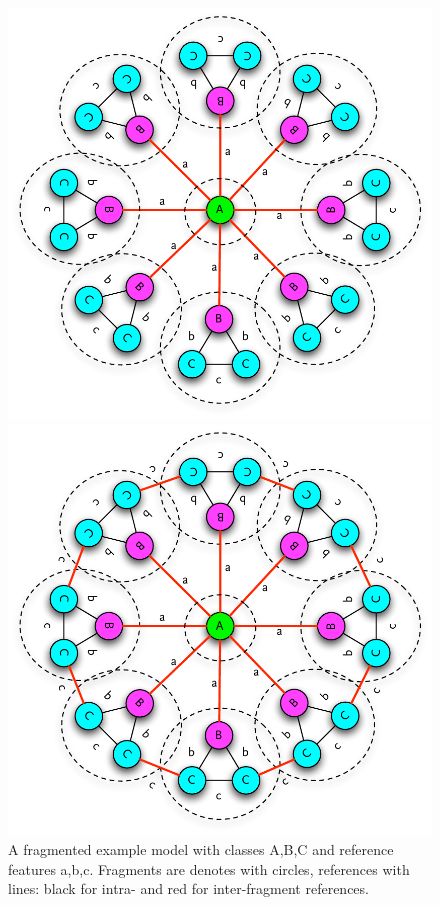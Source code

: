 \begin{figure}[ht]
\begin{minipage}[b]{0.5\linewidth}
\centering
\includegraphics[width=\linewidth]{figures/metamodel_fragmentation_patterns_tree}
\caption{A fragmented example  model with classes A,B,C and reference features a,b,c. Fragments are denotes with circles, references with lines: black for intra- and red for inter-fragment references.}
\label{fig:metamodel_fragmentation_pattern_tree}
\end{minipage}
\hspace{0.5cm}
\begin{minipage}[b]{0.5\linewidth}
\centering
\includegraphics[width=\linewidth]{figures/metamodel_fragmentation_patterns_graph}

\end{minipage}
\end{figure}
